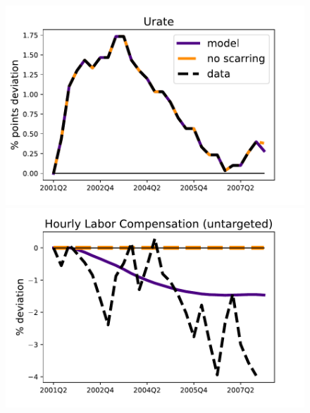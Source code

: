 \begin{figure}[H] %
\centering
\begin{minipage}{0.51\textwidth}
\includegraphics[scale=.57]{text/Chapter1/Figures/2000s/Urate_00s}
\end{minipage}\hspace*{\fill}
\begin{minipage}{0.51\textwidth}
\includegraphics[scale=.57]{text/Chapter1/Figures/2000s/hourly_comp_00s}
\end{minipage}


\end{figure}
